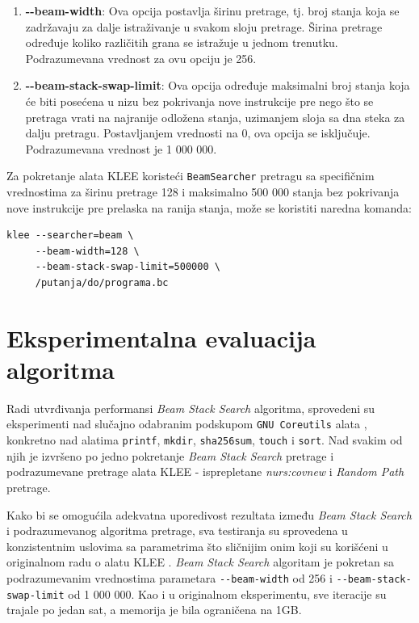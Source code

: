 \documentclass[a4paper]{article}
\begin{document}
\begin{enumerate}
    \item \textbf{{-}{-}beam-width}: Ova opcija postavlja širinu pretrage, tj. broj stanja koja se zadržavaju za dalje istraživanje u svakom sloju pretrage. Širina pretrage određuje koliko različitih grana se istražuje u jednom trenutku. Podrazumevana vrednost za ovu opciju je 256.
    \item \textbf{{-}{-}beam-stack-swap-limit}: Ova opcija određuje maksimalni broj stanja koja će biti posećena u nizu bez pokrivanja nove instrukcije pre nego što se pretraga vrati na najranije odložena stanja, uzimanjem sloja sa dna steka za dalju pretragu. Postavljanjem vrednosti na 0, ova opcija se isključuje. Podrazumevana vrednost je 1 000 000.
\end{enumerate}

Za pokretanje alata KLEE koristeći \verb|BeamSearcher| pretragu sa specifičnim vrednostima za širinu pretrage 128 i maksimalno 500 000 stanja bez pokrivanja nove instrukcije pre prelaska na ranija stanja, može se koristiti naredna komanda:

\begin{verbatim}
klee --searcher=beam \
     --beam-width=128 \
     --beam-stack-swap-limit=500000 \
     /putanja/do/programa.bc
\end{verbatim}

\section{Eksperimentalna evaluacija algoritma}

Radi utvrđivanja performansi \textit{Beam Stack Search} algoritma, sprovedeni su eksperimenti nad slučajno odabranim podskupom \verb|GNU Coreutils| alata \cite{GNUCoreutils}, konkretno nad alatima \verb|printf|, \verb|mkdir|, \verb|sha256sum|, \verb|touch| i \verb|sort|. Nad svakim od njih je izvršeno po jedno pokretanje \textit{Beam Stack Search} pretrage i podrazumevane pretrage alata KLEE - isprepletane \textit{nurs:covnew} i \textit{Random Path} pretrage.

Kako bi se omogućila adekvatna uporedivost rezultata između \textit{Beam Stack Search} i podrazumevanog algoritma pretrage, sva testiranja su sprovedena u konzistentnim uslovima sa parametrima što sličnijim onim koji su korišćeni u originalnom radu o alatu KLEE \cite{KLEE-paper-10.5555/1855741.1855756, KLEEExperiments}. \textit{Beam Stack Search} algoritam je pokretan sa podrazumevanim vrednostima parametara \verb|--beam-width| od 256 i \verb|--beam-stack-swap-limit| od 1 000 000. Kao i u originalnom eksperimentu, sve iteracije su trajale po jedan sat, a memorija je bila ograničena na 1GB.
\end{document}
